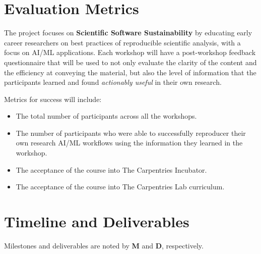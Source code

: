 \documentclass[letterpaper, 11pt]{article}
\newcommand{\milestone}{\textbf{\textrm{M}}}
\newcommand{\deliverable}{\textbf{\textrm{D}}}
\begin{document}
\section{Evaluation Metrics}


The project focuses on \textbf{Scientific Software Sustainability} by educating early career researchers on best practices of reproducible scientific analysis, with a focus on AI/ML applications.
Each workshop will have a post-workshop feedback questionnaire that will be used to not only evaluate the clarity of the content and the efficiency at conveying the material, but also the level of information that the participants learned and found \emph{actionably useful} in their own research.

Metrics for success will include:
\begin{itemize}
  \item The total number of participants across all the workshops.
  \item The number of participants who were able to successfully reproducer their own research AI/ML workflows using the information they learned in the workshop.
  \item The acceptance of the course into The Carpentries Incubator.
  \item The acceptance of the course into The Carpentries Lab curriculum.
\end{itemize}

\section{Timeline and Deliverables}



Milestones and deliverables are noted by \milestone{} and \deliverable{}, respectively.
\end{document}
